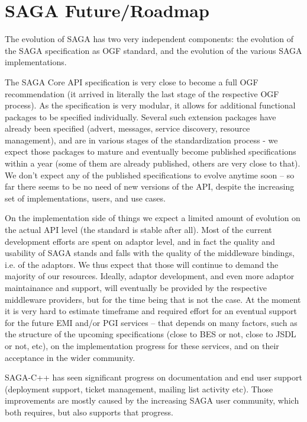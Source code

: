 \documentclass[10pt,conference,final,letterpaper,twoside,twocolumn,]{IEEEtran}
\begin{document}
\section{SAGA Future/Roadmap}

 The evolution of SAGA has two very independent components: the
 evolution of the SAGA specification as OGF standard, and the
 evolution of the various SAGA implementations.

 The SAGA Core API specification is very close to become a full OGF
 recommendation (it arrived in literally the last stage of the
 respective OGF process).  As the specification is very modular, it
 allows for additional functional packages to be specified
 individually.  Several such extension packages have already been
 specified (advert, messages, service discovery, resource management),
 and are in various stages of the standardization process - we expect
 those packages to mature and eventually become published
 specifications within a year (some of them are already published,
 others are very close to that).  We don't expect any of the published
 specifications to evolve anytime soon -- so far there seems to be no
 need of new versions of the API, despite the increasing set of
 implementations, users, and use cases.

 On the implementation side of things we expect a limited amount of
 evolution on the actual API level (the standard is stable after all).
 Most of the current development efforts are spent on adaptor level, and
 in fact the quality and usability of SAGA stands and falls with the
 quality of the middleware bindings, i.e. of the adaptors.  We thus
 expect that those will continue to demand the majority of our
 resources.  Ideally, adaptor development, and even more adaptor
 maintainance and support, will eventually be provided by the respective
 middleware providers, but for the time being that is not the case.  At
 the moment it is very hard to estimate timeframe and required effort
 for an eventual support for the future EMI and/or PGI services -- that
 depends on many factors, such as the structure of the upcoming
 specifications (close to BES or not, close to JSDL or not, etc), on the
 implementation progress for these services, and on their acceptance in
 the wider community.

 SAGA-C++ has seen significant progress on documentation and end user
 support (deployment support, ticket management, mailing list activity
 etc).  Those improvements are mostly caused by the increasing SAGA
 user community, which both requires, but also supports that progress.
\end{document}
